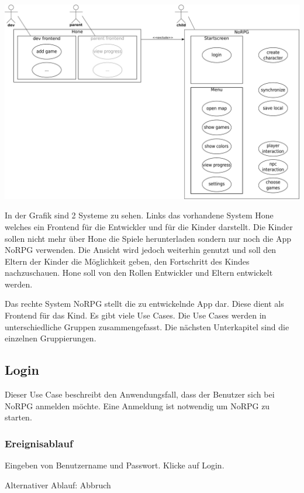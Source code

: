 	\begin{center}
		\includegraphics[width=\textwidth]{pics/OUCD.pdf}
	\end{center}
	
	In der Grafik sind 2 Systeme zu sehen. Links das vorhandene System Hone welches ein Frontend für die Entwickler und für die Kinder darstellt. Die Kinder sollen nicht mehr über Hone die Spiele herunterladen sondern nur noch die App NoRPG verwenden. Die Ansicht wird jedoch weiterhin genutzt und soll den Eltern der Kinder die Möglichkeit geben, den Fortschritt des Kindes nachzuschauen. Hone soll von den Rollen Entwickler und Eltern entwickelt werden.
	
	Das rechte System NoRPG stellt die zu entwickelnde App dar. Diese dient als Frontend für das Kind. Es gibt viele Use Cases. Die Use Cases werden in unterschiedliche Gruppen zusammengefasst. Die nächsten Unterkapitel sind die einzelnen Gruppierungen.
	
	\subsection{Login}
		Dieser Use Case beschreibt den Anwendungsfall, dass der Benutzer sich bei NoRPG anmelden möchte. Eine Anmeldung ist notwendig um NoRPG zu starten. 
			
		\subsubsection{Ereignisablauf}
			Eingeben von Benutzername und Passwort.	Klicke auf Login.
			
			Alternativer Ablauf: Abbruch
			
